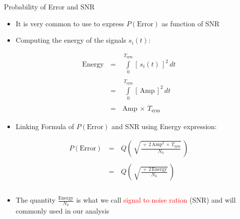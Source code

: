 \documentclass{Beamer}
\begin{document}
\begin{frame}[t,allowframebreaks]{Probability of Error and SNR}


\begin{itemize}

\item It is very common to use to express $P(\text{Error})$ as function of SNR

\item Computing the energy of the signals $s_i(t)$:

\end{itemize}

\begin{equation*}
\begin{array}{rcl}
\text{Energy} \, &=& \, \displaystyle\int\limits_{0}^{T_{\text{sym}}} [\, s_i(t) \,]^2 \, dt  \\ \\
		&=& \, \displaystyle\int\limits_{0}^{T_{\text{sym}}} [\, \text{Amp}  \,]^2 \, dt  \\ \\
		&=& \,\text{Amp} \, \times \, T_{\text{sym}}
\end{array}
\end{equation*}


\newpage
\begin{itemize}

\item Linking Formula of $P(\text{Error})$ and SNR using Energy expression:

\end{itemize}

\begin{equation*}
\begin{array}{rcl}
P(\text{Error}) \, &=& \, Q \left(\, \displaystyle\sqrt{\frac{ \, + \, 2 \, \text{Amp}^2 \, \times \, T_{\text{sym}} }{N_0}}  \, \right)  \\ \\
&=& \, Q \left(\, \displaystyle\sqrt{\frac{ \, + \, 2 \, \text{Energy} }{N_0}}  \, \right)  \\ \\
\end{array}
\end{equation*}

\newpage
\begin{itemize}

\item The quantity $ \displaystyle\frac{\text{Energy}}{N_0}$ is what we call \textcolor{red}{signal to noise ration} (SNR) and will commonly used in our analysis



\end{itemize}
\end{frame}
\end{document}
